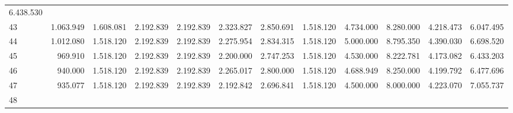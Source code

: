 \begin{tabular}{llllllllllll}
  \multicolumn{1}{r}{6.438.530} \\
\multicolumn{1}{l}{\hspace{1em}43} &
  \multicolumn{1}{|r}{1.063.949} &
  \multicolumn{1}{r}{1.608.081} &
  \multicolumn{1}{r}{2.192.839} &
  \multicolumn{1}{r}{2.192.839} &
  \multicolumn{1}{r}{2.323.827} &
  \multicolumn{1}{r}{2.850.691} &
  \multicolumn{1}{r}{1.518.120} &
  \multicolumn{1}{r}{4.734.000} &
  \multicolumn{1}{r}{8.280.000} &
  \multicolumn{1}{r}{4.218.473} &
  \multicolumn{1}{r}{6.047.495} \\
\multicolumn{1}{l}{\hspace{1em}44} &
  \multicolumn{1}{|r}{1.012.080} &
  \multicolumn{1}{r}{1.518.120} &
  \multicolumn{1}{r}{2.192.839} &
  \multicolumn{1}{r}{2.192.839} &
  \multicolumn{1}{r}{2.275.954} &
  \multicolumn{1}{r}{2.834.315} &
  \multicolumn{1}{r}{1.518.120} &
  \multicolumn{1}{r}{5.000.000} &
  \multicolumn{1}{r}{8.795.350} &
  \multicolumn{1}{r}{4.390.030} &
  \multicolumn{1}{r}{6.698.520} \\
\multicolumn{1}{l}{\hspace{1em}45} &
  \multicolumn{1}{|r}{969.910} &
  \multicolumn{1}{r}{1.518.120} &
  \multicolumn{1}{r}{2.192.839} &
  \multicolumn{1}{r}{2.192.839} &
  \multicolumn{1}{r}{2.200.000} &
  \multicolumn{1}{r}{2.747.253} &
  \multicolumn{1}{r}{1.518.120} &
  \multicolumn{1}{r}{4.530.000} &
  \multicolumn{1}{r}{8.222.781} &
  \multicolumn{1}{r}{4.173.082} &
  \multicolumn{1}{r}{6.433.203} \\
\multicolumn{1}{l}{\hspace{1em}46} &
  \multicolumn{1}{|r}{940.000} &
  \multicolumn{1}{r}{1.518.120} &
  \multicolumn{1}{r}{2.192.839} &
  \multicolumn{1}{r}{2.192.839} &
  \multicolumn{1}{r}{2.265.017} &
  \multicolumn{1}{r}{2.800.000} &
  \multicolumn{1}{r}{1.518.120} &
  \multicolumn{1}{r}{4.688.949} &
  \multicolumn{1}{r}{8.250.000} &
  \multicolumn{1}{r}{4.199.792} &
  \multicolumn{1}{r}{6.477.696} \\
\multicolumn{1}{l}{\hspace{1em}47} &
  \multicolumn{1}{|r}{935.077} &
  \multicolumn{1}{r}{1.518.120} &
  \multicolumn{1}{r}{2.192.839} &
  \multicolumn{1}{r}{2.192.839} &
  \multicolumn{1}{r}{2.192.842} &
  \multicolumn{1}{r}{2.696.841} &
  \multicolumn{1}{r}{1.518.120} &
  \multicolumn{1}{r}{4.500.000} &
  \multicolumn{1}{r}{8.000.000} &
  \multicolumn{1}{r}{4.223.070} &
  \multicolumn{1}{r}{7.055.737} \\
\multicolumn{1}{l}{\hspace{1em}48} &

\end{tabular}
